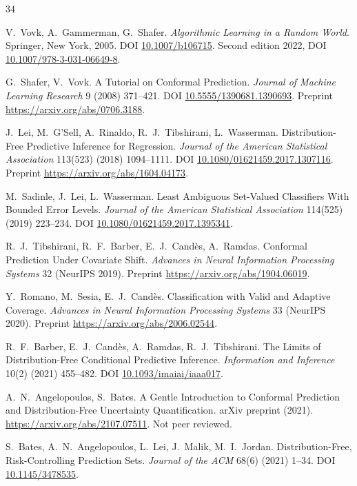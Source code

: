 \documentclass[a4paper,longmktitle]{cas-sc}
\begin{document}
\begin{thebibliography}{34}

 V.~Vovk, A.~Gammerman, G.~Shafer. \emph{Algorithmic Learning in a Random World}. Springer, New York, 2005. DOI \url{10.1007/b106715}. Second edition 2022, DOI \url{10.1007/978-3-031-06649-8}.

 G.~Shafer, V.~Vovk. A Tutorial on Conformal Prediction. \emph{Journal of Machine Learning Research} 9 (2008) 371--421. DOI \url{10.5555/1390681.1390693}. Preprint \url{https://arxiv.org/abs/0706.3188}.

 J.~Lei, M.~G'Sell, A.~Rinaldo, R.~J.~Tibshirani, L.~Wasserman. Distribution-Free Predictive Inference for Regression. \emph{Journal of the American Statistical Association} 113(523) (2018) 1094--1111. DOI \url{10.1080/01621459.2017.1307116}. Preprint \url{https://arxiv.org/abs/1604.04173}.

 M.~Sadinle, J.~Lei, L.~Wasserman. Least Ambiguous Set-Valued Classifiers With Bounded Error Levels. \emph{Journal of the American Statistical Association} 114(525) (2019) 223--234. DOI \url{10.1080/01621459.2017.1395341}.

 R.~J.~Tibshirani, R.~F.~Barber, E.~J.~Cand\`es, A.~Ramdas. Conformal Prediction Under Covariate Shift. \emph{Advances in Neural Information Processing Systems} 32 (NeurIPS 2019). Preprint \url{https://arxiv.org/abs/1904.06019}.

 Y.~Romano, M.~Sesia, E.~J.~Cand\`es. Classification with Valid and Adaptive Coverage. \emph{Advances in Neural Information Processing Systems} 33 (NeurIPS 2020). Preprint \url{https://arxiv.org/abs/2006.02544}.

 R.~F.~Barber, E.~J.~Cand\`es, A.~Ramdas, R.~J.~Tibshirani. The Limits of Distribution-Free Conditional Predictive Inference. \emph{Information and Inference} 10(2) (2021) 455--482. DOI \url{10.1093/imaiai/iaaa017}.

 A.~N.~Angelopoulos, S.~Bates. A Gentle Introduction to Conformal Prediction and Distribution-Free Uncertainty Quantification. arXiv preprint (2021). \url{https://arxiv.org/abs/2107.07511}. Not peer reviewed.

 S.~Bates, A.~N.~Angelopoulos, L.~Lei, J.~Malik, M.~I.~Jordan. Distribution-Free, Risk-Controlling Prediction Sets. \emph{Journal of the ACM} 68(6) (2021) 1--34. DOI \url{10.1145/3478535}.


\end{thebibliography}
\end{document}
